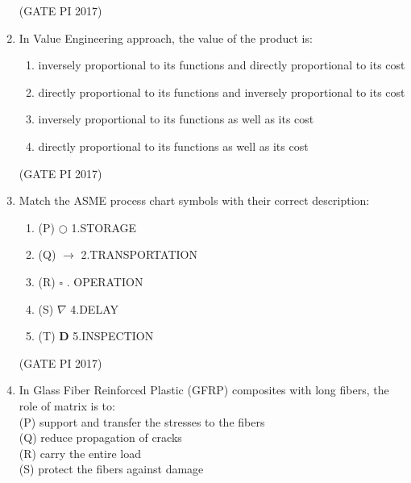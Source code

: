 \documentclass[journal,12pt,onecolumn]{IEEEtran}
\theoremstyle{remark}
\begin{document}
\begin{enumerate}
\hfill (GATE PI 2017)

\item In Value Engineering approach, the value of the product is:
\begin{enumerate}
\item inversely proportional to its functions and directly proportional to its cost
\item directly proportional to its functions and inversely proportional to its cost
\item inversely proportional to its functions as well as its cost
\item directly proportional to its functions as well as its cost
\end{enumerate}
\hfill (GATE PI 2017)

\item Match the ASME process chart symbols with their correct description: \\

\begin{enumerate}

    \item[] (P) $\bigcirc$  \quad 1.STORAGE\\
    \item[] (Q) $\longrightarrow$ \quad 2.TRANSPORTATION\\
    \item[] (R) $\square$ . OPERATION \\
    \item[] (S) $\nabla$ \quad 4.DELAY \\
    \item[] (T) \textbf{D}  \quad 5.INSPECTION \\
\end{enumerate}


\begin{enumerate}
\end{enumerate}
\hfill (GATE PI 2017)

\item In Glass Fiber Reinforced Plastic (GFRP) composites with long fibers, the role of matrix is to:  \\
(P) support and transfer the stresses to the fibers  \\
(Q) reduce propagation of cracks  \\
(R) carry the entire load  \\
(S) protect the fibers against damage  \\


\end{enumerate}
\end{document}
